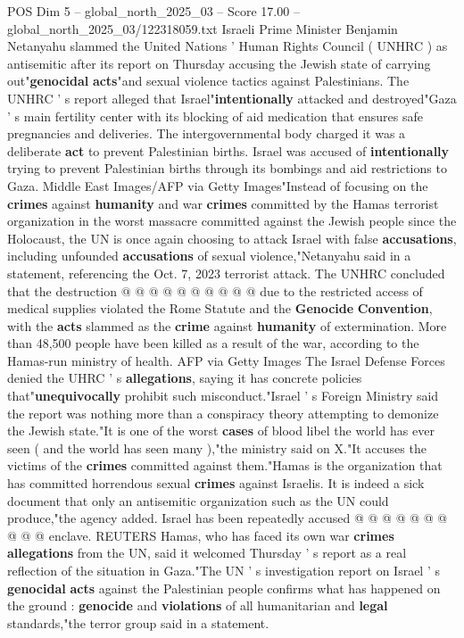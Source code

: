 \begin{textsample}{POS Dim 5 – global\_north\_2025\_03 – Score 17.00 – global\_north\_2025\_03/122318059.txt}  \label{ex:f5_pos_201}
Israeli Prime Minister Benjamin Netanyahu slammed the United Nations ' Human Rights Council ( UNHRC ) as antisemitic after its report on Thursday accusing the Jewish state of carrying out"\textbf{genocidal} \textbf{acts}"and sexual violence tactics against Palestinians.
The UNHRC ' s report alleged that Israel"\textbf{intentionally} attacked and destroyed"Gaza ' s main fertility center with its blocking of aid medication that ensures safe pregnancies and deliveries.
The intergovernmental body charged it was a deliberate \textbf{act} to prevent Palestinian births.
Israel was accused of \textbf{intentionally} trying to prevent Palestinian births through its bombings and aid restrictions to Gaza.
Middle East Images/AFP via Getty Images"Instead of focusing on the \textbf{crimes} against \textbf{humanity} and war \textbf{crimes} committed by the Hamas terrorist organization in the worst massacre committed against the Jewish people since the Holocaust, the UN is once again choosing to attack Israel with false \textbf{accusations}, including unfounded \textbf{accusations} of sexual violence,"Netanyahu said in a statement, referencing the Oct. 7, 2023 terrorist attack.
The UNHRC concluded that the destruction @ @ @ @ @ @ @ @ @ @ due to the restricted access of medical supplies violated the Rome Statute and the \textbf{Genocide} \textbf{Convention}, with the \textbf{acts} slammed as the \textbf{crime} against \textbf{humanity} of extermination.
More than 48,500 people have been killed as a result of the war, according to the Hamas-run ministry of health.
AFP via Getty Images The Israel Defense Forces denied the UHRC ' s \textbf{allegations}, saying it has concrete policies that"\textbf{unequivocally} prohibit such misconduct."Israel ' s Foreign Ministry said the report was nothing more than a conspiracy theory attempting to demonize the Jewish state."It is one of the worst \textbf{cases} of blood libel the world has ever seen ( and the world has seen many ),"the ministry said on X."It accuses the victims of the \textbf{crimes} committed against them."Hamas is the organization that has committed horrendous sexual \textbf{crimes} against Israelis.
It is indeed a sick document that only an antisemitic organization such as the UN could produce,"the agency added.
Israel has been repeatedly accused @ @ @ @ @ @ @ @ @ @ enclave.
REUTERS Hamas, who has faced its own war \textbf{crimes} \textbf{allegations} from the UN, said it welcomed Thursday ' s report as a real reflection of the situation in Gaza."The UN ' s investigation report on Israel ' s \textbf{genocidal} \textbf{acts} against the Palestinian people confirms what has happened on the ground : \textbf{genocide} and \textbf{violations} of all humanitarian and \textbf{legal} standards,"the terror group said in a statement.

\end{textsample}
